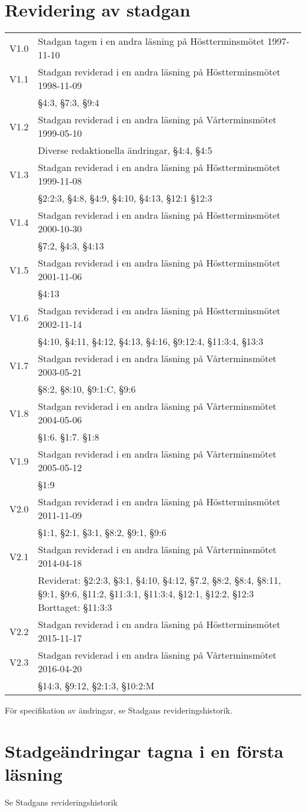 \documentclass[10pt]{article}
\begin{document}
\newpage
\section*{Revidering av stadgan}

\renewcommand*\arraystretch{1}
\begin{tabular}{p{7mm} p{110mm}}
    V1.0 & Stadgan tagen i en andra läsning på Höstterminsmötet 1997-11-10\\
    V1.1 & Stadgan reviderad i en andra läsning på Höstterminsmötet 1998-11-09\\
    & §4:3, §7:3, §9:4\\
    V1.2 & Stadgan reviderad i en andra läsning på Vårterminsmötet 1999-05-10\\
    & Diverse redaktionella ändringar, §4:4, §4:5 \\
    V1.3 & Stadgan reviderad i en andra läsning på Höstterminsmötet 1999-11-08\\
    & §2:2:3, §4:8, §4:9, §4:10, §4:13, §12:1 §12:3\\
    V1.4 & Stadgan reviderad i en andra läsning på Höstterminsmötet 2000-10-30\\
    & §7:2, §4:3, §4:13\\
    V1.5 & Stadgan reviderad i en andra läsning på Höstterminsmötet 2001-11-06\\
    & §4:13\\
    V1.6 & Stadgan reviderad i en andra läsning på Höstterminsmötet 2002-11-14\\
    & §4:10, §4:11, §4:12, §4:13, §4:16, §9:12:4, §11:3:4, §13:3\\
    V1.7 & Stadgan reviderad i en andra läsning på Vårterminsmötet 2003-05-21\\
    & §8:2, §8:10, §9:1:C, §9:6 \\
    V1.8 & Stadgan reviderad i en andra läsning på Vårterminsmötet 2004-05-06\\
    & §1:6. §1:7. §1:8	\\
    V1.9 & Stadgan reviderad i en andra läsning på Vårterminsmötet 2005-05-12\\
    & §1:9\\
    V2.0 & Stadgan reviderad i en andra läsning på Höstterminsmötet 2011-11-09\\
    & §1:1, §2:1, §3:1, §8:2, §9:1, §9:6\\
     V2.1 & Stadgan reviderad i en andra läsning på Vårterminsmötet 2014-04-18\\
    & Reviderat: §2:2:3, §3:1, §4:10, §4:12, §7.2, §8:2, §8:4, §8:11, §9:1, §9:6, §11:2, §11:3:1,
    §11:3:4, §12:1, §12:2, §12:3
    Borttaget: §11:3:3\\
    V2.2 & Stadgan reviderad i en andra läsning på Höstterminsmötet 2015-11-17\\
    V2.3 & Stadgan reviderad i en andra läsning på Vårterminsmötet 2016-04-20\\
     & \S14:3, \S9:12, \S2:1:3, \S10:2:M\\
\end{tabular}
\renewcommand*\arraystretch{1.3}

För specifikation av ändringar, se Stadgans revideringshistorik.

\section*{Stadgeändringar tagna i en första läsning}

Se Stadgans revideringshistorik
\end{document}
